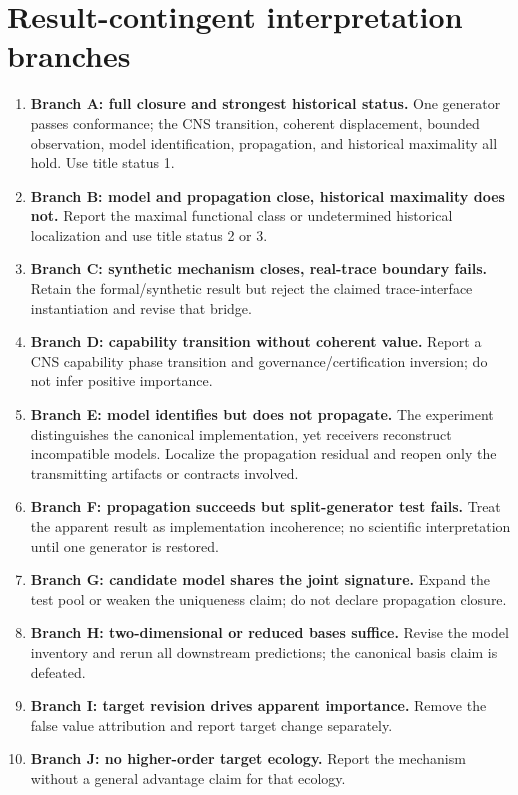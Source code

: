 \documentclass[11pt]{article}
\begin{document}
\section{Result-contingent interpretation branches}

\begin{enumerate}
\item \textbf{Branch A: full closure and strongest historical status.} One generator passes conformance; the CNS transition, coherent displacement, bounded observation, model identification, propagation, and historical maximality all hold. Use title status 1.
\item \textbf{Branch B: model and propagation close, historical maximality does not.} Report the maximal functional class or undetermined historical localization and use title status 2 or 3.
\item \textbf{Branch C: synthetic mechanism closes, real-trace boundary fails.} Retain the formal/synthetic result but reject the claimed trace-interface instantiation and revise that bridge.
\item \textbf{Branch D: capability transition without coherent value.} Report a CNS capability phase transition and governance/certification inversion; do not infer positive importance.
\item \textbf{Branch E: model identifies but does not propagate.} The experiment distinguishes the canonical implementation, yet receivers reconstruct incompatible models. Localize the propagation residual and reopen only the transmitting artifacts or contracts involved.
\item \textbf{Branch F: propagation succeeds but split-generator test fails.} Treat the apparent result as implementation incoherence; no scientific interpretation until one generator is restored.
\item \textbf{Branch G: candidate model shares the joint signature.} Expand the test pool or weaken the uniqueness claim; do not declare propagation closure.
\item \textbf{Branch H: two-dimensional or reduced bases suffice.} Revise the model inventory and rerun all downstream predictions; the canonical basis claim is defeated.
\item \textbf{Branch I: target revision drives apparent importance.} Remove the false value attribution and report target change separately.
\item \textbf{Branch J: no higher-order target ecology.} Report the mechanism without a general advantage claim for that ecology.
\end{enumerate}
\end{document}
